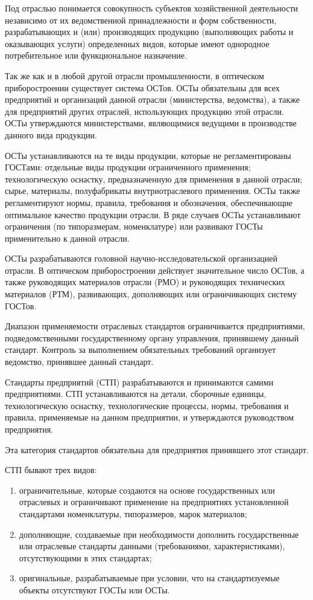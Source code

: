 Под отраслью понимается совокупность субъектов хозяйственной деятельности независимо от их ведомственной принадлежности и форм собственности, разрабатывающих и (или) производящих продукцию (выполняющих работы и оказывающих услуги) определенных видов, которые имеют однородное потребительное или функциональное назначение.

Так же как и в любой другой отрасли промышленности, в оптическом приборостроении существует система ОСТов. ОСТы обязательны для всех предприятий и организаций данной отрасли (министерства, ведомства), а также для предприятий других отраслей, использующих продукцию этой отрасли. ОСТы утверждаются министерствами, являющимися ведущими в производстве данного вида продукции.

ОСТы устанавливаются на те виды продукции, которые не регламентированы ГОСТами: отдельные виды продукции ограниченного применения; технологическую оснастку, предназначенную для применения в данной отрасли; сырье, материалы, полуфабрикаты внутриотраслевого применения. ОСТы также регламентируют нормы, правила, требования и обозначения, обеспечивающие оптимальное качество продукции отрасли. В ряде случаев ОСТы устанавливают ограничения (по типоразмерам, номенклатуре) или развивают ГОСТы применительно к данной отрасли.

ОСТы разрабатываются головной научно-исследовательской организацией отрасли. В оптическом приборостроении действует значительное число ОСТов, а также руководящих материалов отрасли (РМО) и руководящих технических материалов (РТМ), развивающих, дополняющих или ограничивающих систему ГОСТов.

Диапазон применяемости отраслевых стандартов ограничивается предприятиями, подведомственными государственному органу управления, принявшему данный стандарт. Контроль за выполнением обязательных требований организует ведомство, принявшее данный стандарт.

Стандарты предприятий (СТП) разрабатываются и принимаются самими предприятиями. СТП устанавливаются на детали, сборочные единицы, технологическую оснастку, технологические процессы, нормы, требования и правила, применяемые на данном предприятии, и утверждаются руководством предприятия.

Эта категория стандартов обязательна для предприятия принявшего этот стандарт.

СТП бывают трех видов:
\begin{enumerate}
\item ограничительные, которые создаются на основе государственных или отраслевых и ограничивают применение на предприятиях установленной стандартами номенклатуры, типоразмеров, марок материалов;
\item дополняющие, создаваемые при необходимости дополнить государственные или отраслевые стандарты данными (требованиями, характеристиками), отсутствующими в этих стандартах;
\item оригинальные, разрабатываемые при условии, что на стандартизуемые объекты отсутствуют ГОСТы или ОСТы.
\end{enumerate}

